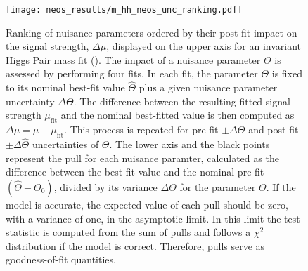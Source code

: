 \begin{figure}
    \centering
    \texttt{[image: neos\_results/m\_hh\_neos\_unc\_ranking.pdf]}
    \caption[]{Ranking of nuisance parameters ordered by their post-fit impact on the signal strength, $\Delta\mu$, displayed on the upper axis for an invariant Higgs Pair mass fit (\mhh{}). The impact of a nuisance parameter $\Theta$ is assessed by performing four fits. In each fit, the parameter $\Theta$ is fixed to its nominal best-fit value $\hat{\Theta}$ plus a given nuisance parameter uncertainty $\Delta\Theta$. The difference between the resulting fitted signal strength $\mu_\text{fit}$ and the nominal best-fitted value is then computed as $\Delta\mu=\hat{\mu} - \mu_\text{fit}$. This process is repeated for pre-fit $\pm\Delta\Theta$ and post-fit $\pm\Delta\hat{\Theta}$ uncertainties of $\Theta$. The lower axis and the black points represent the pull for each nuisance paramter, calculated as the difference between the best-fit value and the nominal pre-fit $(\hat{\Theta} - \Theta_0)$, divided by its variance $\Delta\Theta$ for the parameter $\Theta$. If the model is accurate, the expected value of each pull should be zero, with a variance of one, in the asymptotic limit. In this limit the test statistic is computed from the sum of pulls and follows a $\chi^2$ distribution if the model is correct. Therefore, pulls serve as goodness-of-fit quantities. }
    \label{fig:m_hh_neos_unc_ranking}
\end{figure}


